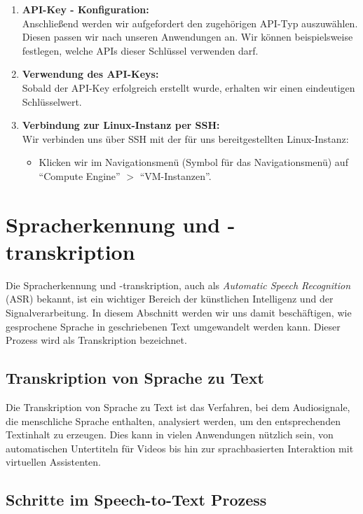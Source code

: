 \documentclass[12pt,a4paper]{article}
\begin{document}
\begin{enumerate}[label=\textbf{\arabic*.}]
\begin{figure}[h!]
\end{figure}
\ \\
\item \textbf{API-Key - Konfiguration:} \\
Anschließend werden wir aufgefordert den zugehörigen API-Typ auszuwählen. Diesen passen wir nach unseren Anwendungen an. Wir können beispielsweise festlegen, welche APIs dieser Schlüssel verwenden darf.
\ \\
\item \textbf{Verwendung des API-Keys:} \\
Sobald der API-Key erfolgreich erstellt wurde, erhalten wir einen eindeutigen Schlüsselwert. 
\item \textbf{Verbindung zur Linux-Instanz per SSH:} \\
Wir verbinden uns über SSH mit der für uns bereitgestellten Linux-Instanz:
\begin{itemize}
	\item Klicken wir im Navigationsmenü (Symbol für das Navigationsmenü) auf \enquote{Compute Engine} $>$ \enquote{VM-Instanzen}.
\end{itemize}
\end{enumerate}

\newpage
\section{Spracherkennung und -transkription}
Die Spracherkennung und -transkription, auch als \textit{Automatic Speech Recognition} (ASR) bekannt, ist ein wichtiger Bereich der künstlichen Intelligenz und der Signalverarbeitung. In diesem Abschnitt werden wir uns damit beschäftigen, wie gesprochene Sprache in geschriebenen Text umgewandelt werden kann. Dieser Prozess wird als Transkription bezeichnet.
\subsection{Transkription von Sprache zu Text}
Die Transkription von Sprache zu Text ist das Verfahren, bei dem Audiosignale, die menschliche Sprache enthalten, analysiert werden, um den entsprechenden Textinhalt zu erzeugen. Dies kann in vielen Anwendungen nützlich sein, von automatischen Untertiteln für Videos bis hin zur sprachbasierten Interaktion mit virtuellen Assistenten.

\subsection{Schritte im Speech-to-Text Prozess}
\end{document}
